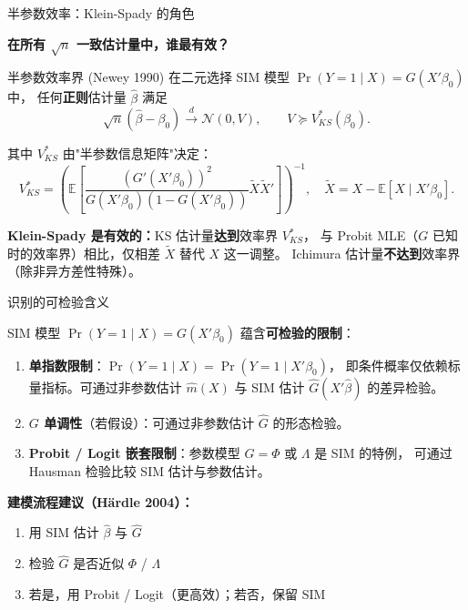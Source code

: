 \documentclass[aspectratio=169, 10pt]{beamer}
\begin{document}
\begin{frame}{半参数效率：Klein-Spady 的角色}

  \textbf{在所有 $\sqrt{n}$ 一致估计量中，谁最有效？}

  \vspace{0.3em}
  \begin{definitionbox}{{半参数效率界 (Newey 1990)}}
    在二元选择 SIM 模型 $\Pr(Y=1\mid X) = G(X'\beta_0)$ 中，
    任何\textbf{正则}估计量 $\hat\beta$ 满足
    $$\sqrt{n}(\hat\beta - \beta_0) \overset{d}{\to} \mathcal{N}(0, V),
    \qquad V \succeq V^{*}_{KS}(\beta_0).$$

    其中 $V^{*}_{KS}$ 由"半参数信息矩阵"决定：
    $$V^{*}_{KS} = \left(\mathbb{E}\!\left[
    \frac{(G'(X'\beta_0))^2}{G(X'\beta_0)(1 - G(X'\beta_0))}
    \tilde X \tilde X'\right]\right)^{-1}, \quad \tilde X = X - \mathbb{E}[X\mid X'\beta_0].$$
  \end{definitionbox}

  \begin{highlightbox}
    \textbf{Klein-Spady 是有效的：}KS 估计量\textbf{达到}效率界 $V^{*}_{KS}$，
    与 Probit MLE（$G$ 已知时的效率界）相比，仅相差 $\tilde X$ 替代 $X$ 这一调整。
    Ichimura 估计量\textbf{不达到}效率界（除非异方差性特殊）。
  \end{highlightbox}

  \hfill{\scriptsize\hyperlink{proof-c10}{}}

\end{frame}

\begin{frame}{识别的可检验含义}

  SIM 模型 $\Pr(Y=1\mid X) = G(X'\beta_0)$ 蕴含\textbf{可检验的限制}：

  \begin{enumerate}\setlength{\itemsep}{2pt}
    \item \textbf{单指数限制}：$\Pr(Y=1\mid X) = \Pr(Y=1\mid X'\beta_0)$，
    即条件概率仅依赖标量指标。可通过非参数估计 $\hat m(X)$ 与 SIM 估计 $\hat G(X'\hat\beta)$
    的差异检验。

    \item \textbf{$G$ 单调性}（若假设）：可通过非参数估计 $\hat G$ 的形态检验。

    \item \textbf{Probit / Logit 嵌套限制}：参数模型 $G = \Phi$ 或 $\Lambda$ 是 SIM 的特例，
    可通过 Hausman 检验比较 SIM 估计与参数估计。
  \end{enumerate}

  \begin{keybox}
    \textbf{建模流程建议（Härdle 2004）：}
    \begin{enumerate}\setlength{\itemsep}{1pt}
      \item 用 SIM 估计 $\hat\beta$ 与 $\hat G$
      \item 检验 $\hat G$ 是否近似 $\Phi$ / $\Lambda$
      \item 若是，用 Probit / Logit（更高效）；若否，保留 SIM
    \end{enumerate}
  \end{keybox}

\end{frame}
\end{document}
